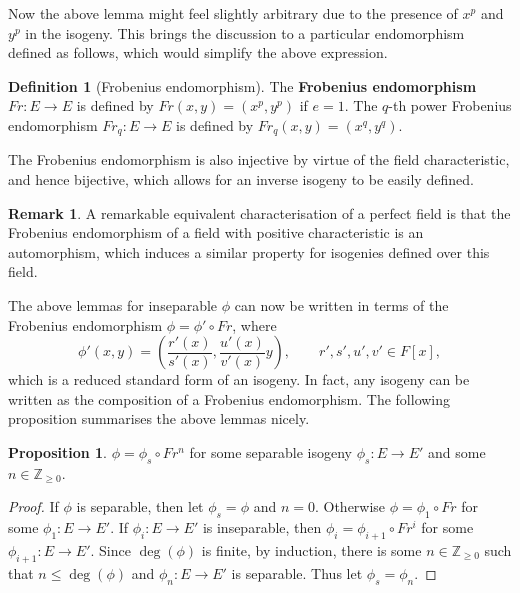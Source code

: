 \documentclass{article}
\newcommand{\Z}{\mathbb{Z}}
\newcommand{\rb}[1]{\left( #1 \right)}
\renewcommand{\sb}[1]{\left[ #1 \right]}
\theoremstyle{definition}\newtheorem*{definition}{Definition}
\theoremstyle{definition}\newtheorem*{example}{Example}
\theoremstyle{definition}\newtheorem*{remark}{Remark}
\newtheorem{proposition}{Proposition}[subsection]
\begin{document}
Now the above lemma might feel slightly arbitrary due to the presence of $ x^p $ and $ y^p $ in the isogeny. This brings the discussion to a particular endomorphism defined as follows, which would simplify the above expression.

\begin{definition}[Frobenius endomorphism]
The \textbf{Frobenius endomorphism} $ Fr : E \to E $ is defined by $ Fr\rb{x, y} = \rb{x^p, y^p} $ if $ e = 1 $. The $ q $-th power Frobenius endomorphism $ Fr_q : E \to E $ is defined by $ Fr_q\rb{x, y} = \rb{x^q, y^q} $.
\end{definition}

The Frobenius endomorphism is also injective by virtue of the field characteristic, and hence bijective, which allows for an inverse isogeny to be easily defined.

\begin{remark}
A remarkable equivalent characterisation of a perfect field is that the Frobenius endomorphism of a field with positive characteristic is an automorphism, which induces a similar property for isogenies defined over this field.
\end{remark}

The above lemmas for inseparable $ \phi $ can now be written in terms of the Frobenius endomorphism $ \phi = \phi' \circ Fr $, where
$$ \phi'\rb{x, y} = \rb{\dfrac{r'\rb{x}}{s'\rb{x}}, \dfrac{u'\rb{x}}{v'\rb{x}}y}, \qquad r', s', u', v' \in F\sb{x}, $$
which is a reduced standard form of an isogeny. In fact, any isogeny can be written as the composition of a Frobenius endomorphism. The following proposition summarises the above lemmas nicely.

\begin{proposition}
$ \phi = \phi_s \circ Fr^n $ for some separable isogeny $ \phi_s : E \to E' $ and some $ n \in \Z_{\ge 0} $.
\end{proposition}

\begin{proof}
If $ \phi $ is separable, then let $ \phi_s = \phi $ and $ n = 0 $. Otherwise $ \phi = \phi_1 \circ Fr $ for some $ \phi_1 : E \to E' $. If $ \phi_i : E \to E' $ is inseparable, then $ \phi_i = \phi_{i + 1} \circ Fr^i $ for some $ \phi_{i + 1} : E \to E' $. Since $ \deg\rb{\phi} $ is finite, by induction, there is some $ n \in \Z_{\ge 0} $ such that $ n \le \deg\rb{\phi} $ and $ \phi_n : E \to E' $ is separable. Thus let $ \phi_s = \phi_n $.
\end{proof}
\end{document}
